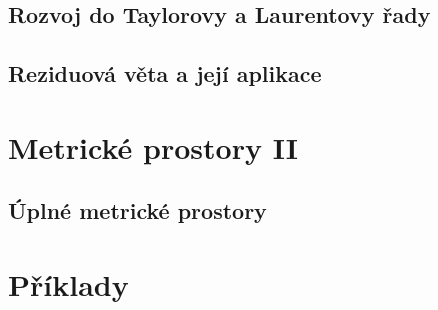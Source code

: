 \documentclass[12pt,a4paper]{article}
\newcounter{vety}
\begin{document}


\subsection{Rozvoj do Taylorovy a Laurentovy řady}



\subsection{Reziduová věta a její aplikace}



\pagebreak
\setcounter{vety}{0}
\section{Metrické prostory II}



\addtocounter{subsection}{1}
\subsection{Úplné metrické prostory}



\pagebreak
\section*{Příklady}


\end{document}
